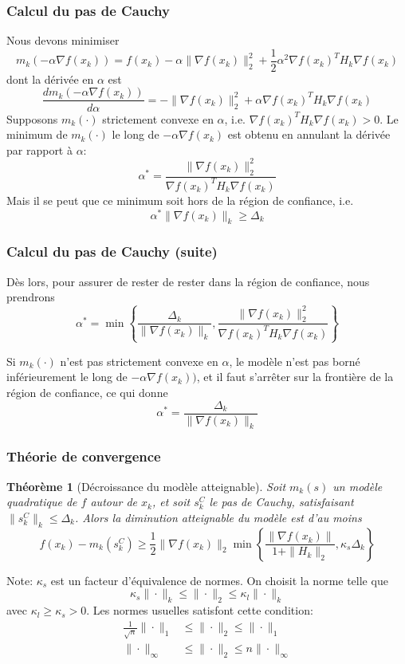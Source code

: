 \documentclass[t,usepdftitle=false]{beamer}
\newtheorem{thm}{Théorème}
\begin{document}
\begin{frame}
\frametitle{Calcul du pas de Cauchy}

Nous devons minimiser
$$
m_k(-\alpha \nabla f(x_k)) = f(x_k) - \alpha \| \nabla f(x_k) \|_2^2 + \frac{1}{2} \alpha^2 \nabla f(x_k)^T H_k \nabla f(x_k)
$$
dont la dérivée en $\alpha$ est
$$
\frac{d m_k(-\alpha \nabla f(x_k))}{d \alpha} = -\| \nabla f(x_k) \|_2^2 + \alpha 
\nabla f(x_k)^T H_k \nabla f(x_k)
$$
Supposons $m_k(\cdot)$ strictement convexe en $\alpha$, i.e. $\nabla f(x_k)^T H_k \nabla f(x_k) > 0$.
Le minimum de $m_k(\cdot)$ le long de $-\alpha \nabla f(x_k)$ est obtenu en annulant la dérivée par rapport à $\alpha$:
$$
\alpha^* = \frac{\| \nabla f(x_k) \|_2^2}{\nabla f(x_k)^T H_k \nabla f(x_k)}
$$
Mais il se peut que ce minimum soit hors de la région de confiance, i.e.
$$
\alpha^* \| \nabla f(x_k) \|_k \geq \Delta_k
$$

\end{frame}

\begin{frame}
\frametitle{Calcul du pas de Cauchy (suite)}

Dès lors, pour assurer de rester de rester dans la région de confiance, nous prendrons
$$
\alpha^* = \min
\left\{
\frac{\Delta_k}{\| \nabla f(x_k) \|_k},
\frac{\| \nabla f(x_k) \|_2^2}{\nabla f(x_k)^T H_k \nabla f(x_k)}
\right\}
$$

\mbox{}

Si $m_k(\cdot)$ n'est pas strictement convexe en $\alpha$, le modèle n'est pas borné inférieurement le long de $-\alpha \nabla f(x_k))$, et il faut s'arrêter sur la frontière de la région de confiance, ce qui donne
$$
\alpha^* = \frac{\Delta_k}{\| \nabla f(x_k) \|_k}
$$
\end{frame}

\begin{frame}
\frametitle{Théorie de convergence}

\begin{thm}[Décroissance du modèle atteignable]
Soit $m_k(s)$ un modèle quadratique de $f$ autour de $x_k$, et soit $s_k^C$ le pas de Cauchy, satisfaisant $\| s_k^C \|_k \leq \Delta_k$.
Alors la diminution atteignable du modèle est d'au moins
$$
f(x_k) - m_k(s_k^C) \geq \frac{1}{2} \| \nabla f(x_k) \|_2
\min \left\{ \frac{\| \nabla f(x_k) \|}{1+\| H_k \|_2}, \kappa_s \Delta_k \right\}
$$
\end{thm}

Note: $\kappa_s$ est un facteur d'équivalence de normes. On choisit la norme telle que
$$
\kappa_s \| \cdot \|_k \leq  \| \cdot \|_2 \leq \kappa_l \| \cdot \|_k
$$
avec $\kappa_l \geq \kappa_s > 0$. Les normes usuelles satisfont cette condition:
\begin{align*}
\frac{1}{\sqrt{n}} \| \cdot \|_1 & \leq \| \cdot \|_2 \leq \| \cdot \|_1 \\
 \| \cdot \|_{\infty} & \leq \| \cdot \|_2 \leq n \| \cdot \|_{\infty} \\
\end{align*}

\end{frame}
\end{document}
